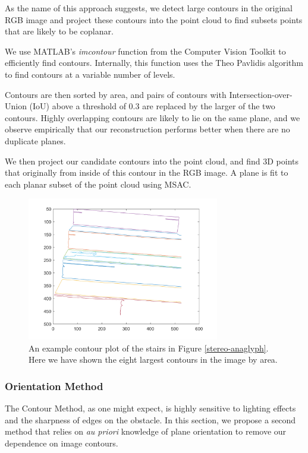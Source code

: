 As the name of this approach suggests, we detect large contours in the original RGB image and project these contours into the point cloud to find subsets points that are likely to be coplanar.

We use MATLAB's \textit{imcontour} function from the Computer Vision Toolkit to efficiently find contours. Internally, this function uses the Theo Pavlidis algorithm \cite{pavlidis} to find contours at a variable number of levels.

Contours are then sorted by area, and pairs of contours with Intersection-over-Union (IoU) above a threshold of 0.3 are replaced by the larger of the two contours. Highly overlapping contours are likely to lie on the same plane, and we observe empirically that our reconstruction performs better when there are no duplicate planes.

We then project our candidate contours into the point cloud, and find 3D points that originally from inside of this contour in the RGB image. A plane is fit to each planar subset of the point cloud using MSAC.

\begin{figure}[!h]
\centering
\includegraphics[width=3.3in]{Sections/Figures/good_contour_plot_12-7.png}
\caption{An example contour plot of the stairs in Figure \ref{stereo-anaglyph}. Here we have shown the eight largest contours in the image by area.}
\label{contours-example}
\end{figure}

\subsubsection{Orientation Method} \label{orient-method}

The Contour Method, as one might expect, is highly sensitive to lighting effects and the sharpness of edges on the obstacle. In this section, we propose a second method that relies on \textit{au priori} knowledge of plane orientation to remove our dependence on image contours.

